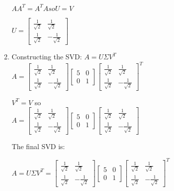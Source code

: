\documentclass{article}%
\begin{document}
\begin{enumerate}
\begin{enumerate}
        $AA^T = A^TA so U = V$

        $U = \begin{bmatrix}
            \frac{1}{\sqrt{2}} & \frac{1}{\sqrt{2}} \\
            \frac{1}{\sqrt{2}} & -\frac{1}{\sqrt{2}}
        \end{bmatrix}$

        \item Constructing the SVD:
        $A = U\Sigma V^T$ \\
        $A = \begin{bmatrix}
            \frac{1}{\sqrt{2}} & \frac{1}{\sqrt{2}} \\
            \frac{1}{\sqrt{2}} & -\frac{1}{\sqrt{2}}
        \end{bmatrix} \begin{bmatrix}
            5 & 0\\
            0 & 1
        \end{bmatrix} \begin{bmatrix}
            \frac{1}{\sqrt{2}} & \frac{1}{\sqrt{2}} \\
            \frac{1}{\sqrt{2}} & -\frac{1}{\sqrt{2}}
        \end{bmatrix}^T$

        $V^T = V$ so \\
        $A = \begin{bmatrix}
            \frac{1}{\sqrt{2}} & \frac{1}{\sqrt{2}} \\
            \frac{1}{\sqrt{2}} & -\frac{1}{\sqrt{2}}
        \end{bmatrix} \begin{bmatrix}
            5 & 0\\
            0 & 1
        \end{bmatrix} \begin{bmatrix}
            \frac{1}{\sqrt{2}} & \frac{1}{\sqrt{2}} \\
            \frac{1}{\sqrt{2}} & -\frac{1}{\sqrt{2}}
        \end{bmatrix}$

        The final SVD is:

        $A = U \Sigma V^T = \begin{bmatrix}
            \frac{1}{\sqrt{2}} & \frac{1}{\sqrt{2}} \\
            \frac{1}{\sqrt{2}} & -\frac{1}{\sqrt{2}}
        \end{bmatrix} \begin{bmatrix}
            5 & 0\\
            0 & 1
        \end{bmatrix} \begin{bmatrix}
            \frac{1}{\sqrt{2}} & \frac{1}{\sqrt{2}} \\
            \frac{1}{\sqrt{2}} & -\frac{1}{\sqrt{2}}
        \end{bmatrix}^T$
    \end{enumerate}


\end{enumerate}
\end{document}

